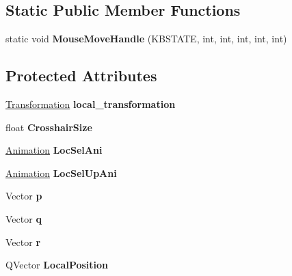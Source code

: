\subsection*{Static Public Member Functions}
\begin{DoxyCompactItemize}
\item 
static void {\bfseries Mouse\+Move\+Handle} (K\+B\+S\+T\+A\+TE, int, int, int, int, int)\hypertarget{classLocationSelect_a024858ff825b777397382e8c000213a1}{}\label{classLocationSelect_a024858ff825b777397382e8c000213a1}

\end{DoxyCompactItemize}
\subsection*{Protected Attributes}
\begin{DoxyCompactItemize}
\item 
\hyperlink{structTransformation}{Transformation} {\bfseries local\+\_\+transformation}\hypertarget{classLocationSelect_a68df08d71b93b593c959e6ed98193e28}{}\label{classLocationSelect_a68df08d71b93b593c959e6ed98193e28}

\item 
float {\bfseries Crosshair\+Size}\hypertarget{classLocationSelect_a83024cbfbdfca7d5938f756fd4d8c230}{}\label{classLocationSelect_a83024cbfbdfca7d5938f756fd4d8c230}

\item 
\hyperlink{classAnimation}{Animation} {\bfseries Loc\+Sel\+Ani}\hypertarget{classLocationSelect_a8a209e425f4e9333ee2e030033b206d3}{}\label{classLocationSelect_a8a209e425f4e9333ee2e030033b206d3}

\item 
\hyperlink{classAnimation}{Animation} {\bfseries Loc\+Sel\+Up\+Ani}\hypertarget{classLocationSelect_a631ed0f6a1482306763374694bb3a1a7}{}\label{classLocationSelect_a631ed0f6a1482306763374694bb3a1a7}

\item 
Vector {\bfseries p}\hypertarget{classLocationSelect_a4cd10d0a9d57da359e946fbd27cf6a67}{}\label{classLocationSelect_a4cd10d0a9d57da359e946fbd27cf6a67}

\item 
Vector {\bfseries q}\hypertarget{classLocationSelect_aabf60943bbee902506e5f324cec5ecc5}{}\label{classLocationSelect_aabf60943bbee902506e5f324cec5ecc5}

\item 
Vector {\bfseries r}\hypertarget{classLocationSelect_a6cb48db90561d1c83f8e239bea2f87c3}{}\label{classLocationSelect_a6cb48db90561d1c83f8e239bea2f87c3}

\item 
Q\+Vector {\bfseries Local\+Position}\hypertarget{classLocationSelect_a5b8d9d8095dd7995e05b2e8b7e237419}{}\label{classLocationSelect_a5b8d9d8095dd7995e05b2e8b7e237419}

\end{DoxyCompactItemize}


